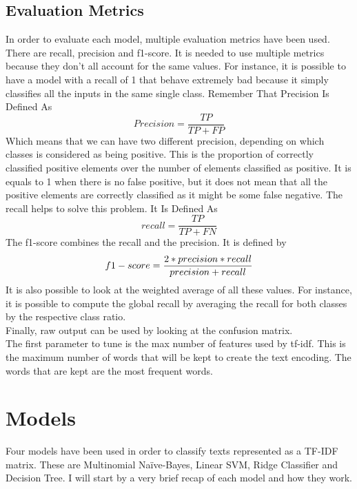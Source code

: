 \subsection{Evaluation Metrics}
In order to evaluate each model, multiple evaluation metrics have been used. There are recall, precision and f1-score. It is needed to use multiple metrics because they don't all account for the same values. For instance, it is possible to have a model with a recall of 1 that behave extremely bad because it simply classifies all the inputs in the same single class. 
Remember That Precision Is Defined As \begin{equation}
 Precision = \frac{TP}{TP + FP}
\end{equation}
Which means that we can have two different precision, depending on which classes is considered as being positive. This is the proportion of correctly classified positive elements over the number of elements classified as positive. It is equals to 1 when there is no false positive, but it does not mean that all the positive elements are correctly classified as it might be some false negative. The recall helps to solve this problem.
It Is Defined As \begin{equation}
 recall = \frac{TP}{TP + FN}
\end{equation}
The f1-score combines the recall and the precision. It is defined by 
\begin{equation}
 f1-score = \frac{2 * precision * recall}{precision + recall}\\
\end{equation}
It is also possible to look at the weighted average of all these values. For instance, it is possible to compute the global recall by averaging the recall for both classes by the respective class ratio. \\

Finally, raw output can be used by looking at the confusion matrix.\\

The first parameter to tune is the max number of features used by tf-idf. This is the maximum number of words that will be kept to create the text encoding. The words that are kept are the most frequent words. 
\section{Models}
Four models have been used in order to classify texts represented as a TF-IDF matrix. These are Multinomial Na\"{i}ve-Bayes, Linear SVM, Ridge Classifier and Decision Tree. I will start by a very brief recap of each model and how they work. 
